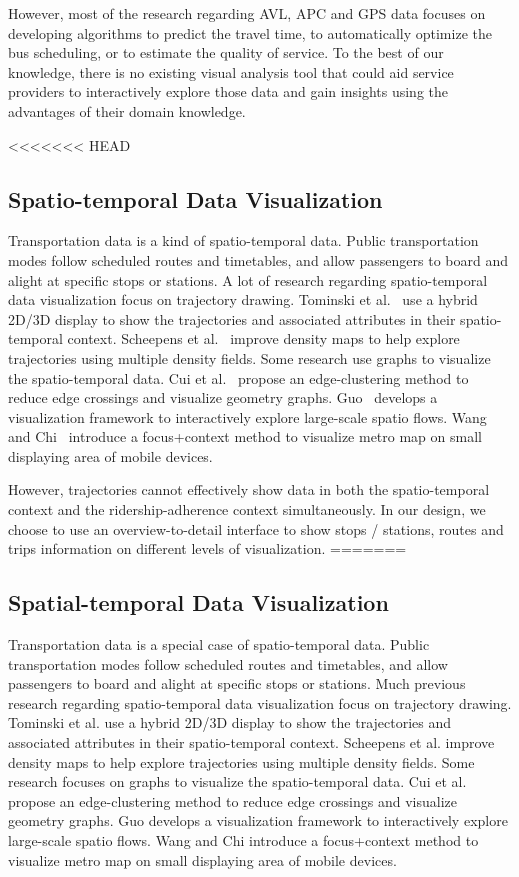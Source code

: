 \documentclass[journal]{vgtc}                %
\begin{document}
However, most of the research regarding AVL, APC and GPS data focuses on developing algorithms to predict the travel time, to automatically optimize the bus scheduling, or to estimate the quality of service. To the best of our knowledge, there is no existing visual analysis tool that could aid service providers to interactively explore those data and gain insights using the advantages of their domain knowledge.

<<<<<<< HEAD
\subsection{Spatio-temporal Data Visualization}
Transportation data is a kind of spatio-temporal data. Public transportation modes follow scheduled routes and timetables, and allow passengers to board and alight at specific stops or stations. A lot of research regarding spatio-temporal data visualization focus on trajectory drawing. 
Tominski et al.~\cite{Tominski2012} use a hybrid 2D/3D display to show the trajectories and associated attributes in their spatio-temporal context.
Scheepens et al.~\cite{6065019} improve density maps to help explore trajectories using multiple density fields.
Some research use graphs to visualize the spatio-temporal data.
Cui et al.~\cite{4658140} propose an edge-clustering method to reduce edge crossings and visualize geometry graphs.
Guo~\cite{5290710} develops a visualization framework to interactively explore large-scale spatio flows.
Wang and Chi~\cite{6065020} introduce a focus+context method to visualize metro map on small displaying area of mobile devices.

However, trajectories cannot effectively show data in both the spatio-temporal context and the ridership-adherence context simultaneously. In our design, we choose to use an overview-to-detail interface to show stops / stations, routes and trips information on different levels of visualization.
=======
\subsection{Spatial-temporal Data Visualization}
Transportation data is a special case of spatio-temporal data. Public transportation modes follow scheduled routes and timetables, and allow passengers to board and alight at specific stops or stations. Much previous research regarding spatio-temporal data visualization focus on trajectory drawing. 
Tominski et al. \cite{Tominski2012} use a hybrid 2D/3D display to show the trajectories and associated attributes in their spatio-temporal context.
Scheepens et al. \cite{6065019} improve density maps to help explore trajectories using multiple density fields.
Some research focuses on graphs to visualize the spatio-temporal data.
Cui et al. \cite{4658140} propose an edge-clustering method to reduce edge crossings and visualize geometry graphs.
Guo \cite{5290710} develops a visualization framework to interactively explore large-scale spatio flows.
Wang and Chi \cite{6065020} introduce a focus+context method to visualize metro map on small displaying area of mobile devices.
\end{document}
